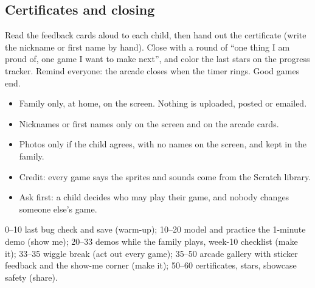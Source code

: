\documentclass[track=junior,level=2,teacher]{kidscode}
\begin{document}
\subsection{Certificates and closing}
Read the feedback cards aloud to each child, then hand out the certificate (write the nickname or
first name by hand). Close with a round of \enquote{one thing I am proud of, one game I want to make
next}, and color the last stars on the progress tracker. Remind everyone: the arcade closes when the
timer rings. Good games end.

\begin{safety}
\begin{itemize}[itemsep=1pt]
  \item Family only, at home, on the screen. Nothing is uploaded, posted or emailed.
  \item Nicknames or first names only on the screen and on the arcade cards.
  \item Photos only if the child agrees, with no names on the screen, and kept in the family.
  \item Credit: every game says the sprites and sounds come from the Scratch library.
  \item Ask first: a child decides who may play their game, and nobody changes someone else's game.
\end{itemize}
\end{safety}

\begin{teachernote}
0--10 last bug check and save (warm-up); 10--20 model and practice the 1-minute demo (show me);
20--33 demos while the family plays, week-10 checklist (make it); 33--35 wiggle break (act out every
game); 35--50 arcade gallery with sticker feedback and the show-me corner (make it); 50--60
certificates, stars, showcase safety (share).
\end{teachernote}

\clearpage
\end{document}
